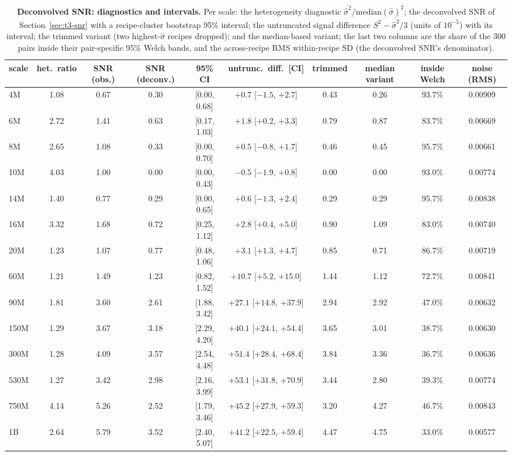 \begin{table}[!htbp]
\centering
\caption{\textbf{Deconvolved SNR: diagnostics and intervals.} Per scale: the heterogeneity
diagnostic $\overline{\hat\sigma^2}/\mathrm{median}(\hat\sigma)^2$; the deconvolved SNR of
Section~\ref{sec:t3-snr} with a recipe-cluster bootstrap 95\% interval; the untruncated signal
difference $S^2 - \overline{\hat\sigma^2}/3$ (units of $10^{-5}$) with its interval; the
trimmed variant (two highest-$\hat\sigma$ recipes dropped); and the median-based variant; the last two columns are the share of the 300 pairs inside their pair-specific 95\% Welch bands, and the across-recipe RMS within-recipe SD (the deconvolved SNR's denominator).}
\label{tab:snr-ci}
\scriptsize
\setlength{\tabcolsep}{2pt}
\begin{tabular}{@{}lccccccccc@{}}
\toprule
scale & het.\ ratio & SNR (obs.) & SNR (deconv.) & 95\% CI & untrunc.\ diff.\ [CI] & trimmed & median variant & inside Welch & noise (RMS) \\
\midrule
4M & 1.08 & 0.67 & 0.30 & [0.00, 0.68] & $+0.7$ [$-1.5$, $+2.7$] & 0.43 & 0.26 & 93.7\% & 0.00909 \\
6M & 2.72 & 1.41 & 0.63 & [0.17, 1.03] & $+1.8$ [$+0.2$, $+3.3$] & 0.79 & 0.87 & 83.7\% & 0.00669 \\
8M & 2.65 & 1.08 & 0.33 & [0.00, 0.70] & $+0.5$ [$-0.8$, $+1.7$] & 0.46 & 0.45 & 95.7\% & 0.00661 \\
10M & 4.03 & 1.00 & 0.00 & [0.00, 0.43] & $-0.5$ [$-1.9$, $+0.8$] & 0.00 & 0.00 & 93.0\% & 0.00774 \\
14M & 1.40 & 0.77 & 0.29 & [0.00, 0.65] & $+0.6$ [$-1.3$, $+2.4$] & 0.29 & 0.29 & 95.7\% & 0.00838 \\
16M & 3.32 & 1.68 & 0.72 & [0.25, 1.12] & $+2.8$ [$+0.4$, $+5.0$] & 0.90 & 1.09 & 83.0\% & 0.00740 \\
20M & 1.23 & 1.07 & 0.77 & [0.48, 1.06] & $+3.1$ [$+1.3$, $+4.7$] & 0.85 & 0.71 & 86.7\% & 0.00719 \\
60M & 1.21 & 1.49 & 1.23 & [0.82, 1.52] & $+10.7$ [$+5.2$, $+15.0$] & 1.44 & 1.12 & 72.7\% & 0.00841 \\
90M & 1.81 & 3.60 & 2.61 & [1.88, 3.42] & $+27.1$ [$+14.8$, $+37.9$] & 2.94 & 2.92 & 47.0\% & 0.00632 \\
150M & 1.29 & 3.67 & 3.18 & [2.29, 4.20] & $+40.1$ [$+24.1$, $+54.4$] & 3.65 & 3.01 & 38.7\% & 0.00630 \\
300M & 1.28 & 4.09 & 3.57 & [2.54, 4.48] & $+51.4$ [$+28.4$, $+68.4$] & 3.84 & 3.36 & 36.7\% & 0.00636 \\
530M & 1.27 & 3.42 & 2.98 & [2.16, 3.99] & $+53.1$ [$+31.8$, $+70.9$] & 3.44 & 2.80 & 39.3\% & 0.00774 \\
750M & 4.14 & 5.26 & 2.52 & [1.79, 3.46] & $+45.2$ [$+27.9$, $+59.3$] & 3.20 & 4.27 & 46.7\% & 0.00843 \\
1B & 2.64 & 5.79 & 3.52 & [2.40, 5.07] & $+41.2$ [$+22.5$, $+59.4$] & 4.47 & 4.75 & 33.0\% & 0.00577 \\
\bottomrule
\end{tabular}
\end{table}

